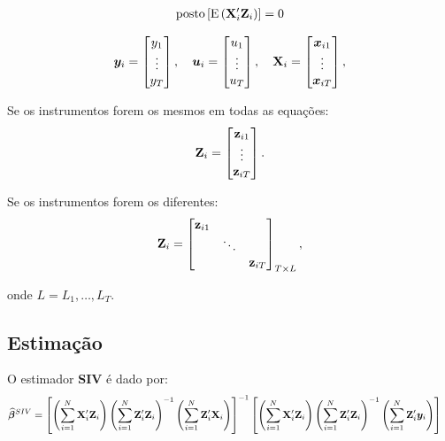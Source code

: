 \documentclass[11pt, oneside, a4paper, article]{article}
\numberwithin{equation}{section}
\begin{document}
\begin{description}
\begin{hypo}
\begin{align*}
	\text{posto} \left[ \text{E}\left( \mathbf{X}_{i}' \mathbf{Z}_{i} \right) \right] = 0
\end{align*}
\end{hypo}

\begin{align*}
\boldsymbol{y}_{i} = 
\begin{bmatrix}
	y_{1} \\ \vdots \\ y_{T}		
\end{bmatrix},
\quad
\boldsymbol{u}_{i} = 
\begin{bmatrix}
	u_{1} \\ \vdots \\ u_{T}		
\end{bmatrix},
\quad
\mathbf{X}_{i} = 
\begin{bmatrix}
	\boldsymbol{x}_{i1} \\ \vdots \\ \boldsymbol{x}_{iT}		
\end{bmatrix},
\end{align*}

Se os instrumentos forem os mesmos em todas as equações:
\begin{align*}
	\mathbf{Z}_{i} = 
\begin{bmatrix}
	\mathbf{z}_{i1} \\ \vdots \\ \mathbf{z}_{iT}		
\end{bmatrix}.
\end{align*}

Se os instrumentos forem os diferentes:
\begin{align*}
	\mathbf{Z}_{i} = 
\begin{bmatrix}
\mathbf{z}_{i1} & & \\
& \ddots & \\
& &	\mathbf{z}_{iT}		
\end{bmatrix}_{T \times L},
\end{align*}

\noident
onde $L = L_{1}, \dots, L_{T}$.

\subsection{Estimação}

O estimador \textbf{SIV} é dado por:
\begin{align*}
\widehat{\boldsymbol{\beta}}^{SIV} &=
\left[
	\left( \sum_{i=1}^{N} \mathbf{X}_{i}' \mathbf{Z}_{i} \right) 
	\left( \sum_{i=1}^{N} \mathbf{Z}_{i}' \mathbf{Z}_{i} \right)^{-1} 
	\left( \sum_{i=1}^{N} \mathbf{Z}_{i}' \mathbf{X}_{i} \right) 
\right]^{-1}
\left[
	\left( \sum_{i=1}^{N} \mathbf{X}_{i}' \mathbf{Z}_{i} \right) 
	\left( \sum_{i=1}^{N} \mathbf{Z}_{i}' \mathbf{Z}_{i} \right)^{-1} 
	\left( \sum_{i=1}^{N} \mathbf{Z}_{i}' \boldsymbol{y}_{i} \right) 
\right]
\end{align*}


\end{description}
\end{document}
